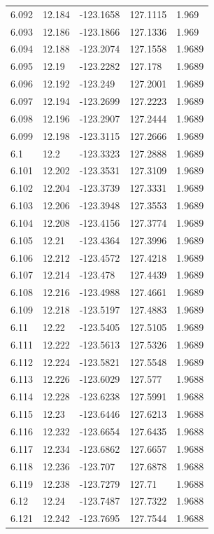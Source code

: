 \begin{tabular}{lllll}
6.092 & 12.184 & -123.1658 & 127.1115 & 1.969 \\
6.093 & 12.186 & -123.1866 & 127.1336 & 1.969 \\
6.094 & 12.188 & -123.2074 & 127.1558 & 1.9689 \\
6.095 & 12.19 & -123.2282 & 127.178 & 1.9689 \\
6.096 & 12.192 & -123.249 & 127.2001 & 1.9689 \\
6.097 & 12.194 & -123.2699 & 127.2223 & 1.9689 \\
6.098 & 12.196 & -123.2907 & 127.2444 & 1.9689 \\
6.099 & 12.198 & -123.3115 & 127.2666 & 1.9689 \\
6.1 & 12.2 & -123.3323 & 127.2888 & 1.9689 \\
6.101 & 12.202 & -123.3531 & 127.3109 & 1.9689 \\
6.102 & 12.204 & -123.3739 & 127.3331 & 1.9689 \\
6.103 & 12.206 & -123.3948 & 127.3553 & 1.9689 \\
6.104 & 12.208 & -123.4156 & 127.3774 & 1.9689 \\
6.105 & 12.21 & -123.4364 & 127.3996 & 1.9689 \\
6.106 & 12.212 & -123.4572 & 127.4218 & 1.9689 \\
6.107 & 12.214 & -123.478 & 127.4439 & 1.9689 \\
6.108 & 12.216 & -123.4988 & 127.4661 & 1.9689 \\
6.109 & 12.218 & -123.5197 & 127.4883 & 1.9689 \\
6.11 & 12.22 & -123.5405 & 127.5105 & 1.9689 \\
6.111 & 12.222 & -123.5613 & 127.5326 & 1.9689 \\
6.112 & 12.224 & -123.5821 & 127.5548 & 1.9689 \\
6.113 & 12.226 & -123.6029 & 127.577 & 1.9688 \\
6.114 & 12.228 & -123.6238 & 127.5991 & 1.9688 \\
6.115 & 12.23 & -123.6446 & 127.6213 & 1.9688 \\
6.116 & 12.232 & -123.6654 & 127.6435 & 1.9688 \\
6.117 & 12.234 & -123.6862 & 127.6657 & 1.9688 \\
6.118 & 12.236 & -123.707 & 127.6878 & 1.9688 \\
6.119 & 12.238 & -123.7279 & 127.71 & 1.9688 \\
6.12 & 12.24 & -123.7487 & 127.7322 & 1.9688 \\
6.121 & 12.242 & -123.7695 & 127.7544 & 1.9688 \\

\end{tabular}
